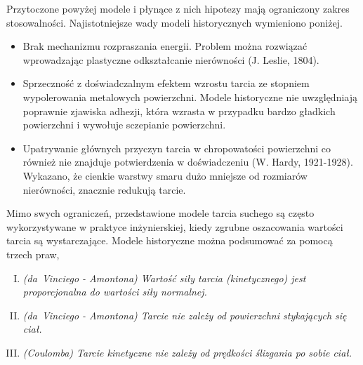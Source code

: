 \documentclass[12pt,a4paper,openright]{report} %
\begin{document}
Przytoczone powyżej modele i płynące z nich hipotezy mają ograniczony zakres stosowalności. Najistotniejsze wady modeli historycznych wymieniono poniżej.
\begin{itemize}
\item{Brak mechanizmu rozpraszania energii. Problem można rozwiązać wprowadzając plastyczne odkształcanie nierówności (J. Leslie, 1804)\cite{Bowden1980}.}
\item{Sprzeczność z doświadczalnym efektem wzrostu tarcia ze stopniem wypolerowania metalowych powierzchni. Modele historyczne nie uwzględniają poprawnie zjawiska adhezji, która wzrasta w przypadku bardzo gładkich powierzchni i wywołuje sczepianie powierzchni.}
\item{Upatrywanie głównych przyczyn tarcia w chropowatości powierzchni co również nie znajduje potwierdzenia w doświadczeniu (W. Hardy, 1921-1928). Wykazano, że cienkie warstwy smaru dużo mniejsze od rozmiarów nierówności, znacznie redukują tarcie.}
\end{itemize}

Mimo swych ograniczeń, przedstawione modele tarcia suchego są często wykorzystywane w praktyce inżynierskiej, kiedy zgrubne oszacowania wartości tarcia są wystarczające. Modele historyczne można podsumować za pomocą trzech praw,
\begin{enumerate}[I.]
\item \textit{(da~Vinciego - Amontona) Wartość siły tarcia (kinetycznego) jest proporcjonalna do wartości siły normalnej.}
\item \textit{(da~Vinciego - Amontona) Tarcie nie zależy od powierzchni stykających się ciał.}
\item \textit{(Coulomba) Tarcie kinetyczne nie zależy od prędkości ślizgania po sobie ciał.}
\end{enumerate}
%
\end{document}
